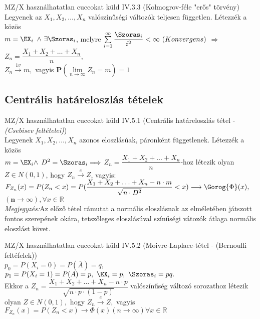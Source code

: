 \begin{tetel}{MZ/X használhatatlan cuccokat küld}
	IV.3.3 (Kolmogrov-féle "erős" törvény)\\[2pt]
		\forceindent Legyenek az $X_1,X_2,\ldots,X_n$ valószínűségi változók teljesen független. Létezzék a közös \\[2pt]$m = \EX_i$ $\land\ \exists \Szoras_i$, melyre $\sum\limits_{i=1}^\infty \dfrac{\Szoras_i}{i^2} < \infty \ (Konvergens)$ $\Longrightarrow$ $Z_n = \dfrac{X_1+X_2+\ldots+X_n}{n},$ \\[2pt]
		$Z_n \xrightarrow{1v} m,$ vagyis $\mathbf{P}(\lim\limits_{n \to \infty} Z_n = m) = 1$
\end{tetel}
\subsection{Centrális határeloszlás tételek}
	\begin{tetel}{MZ/X használhatatlan cuccokat küld}
  IV.5.1 (Centrális határeloszlás tétel - \textit{(Csebisev feltételei)})\\[2pt]
	\forceindent  Legyenek $X_1,X_2,\ldots,X_n$ azonos eloszlásúak, páronként függetlenek. Létezzék a közös\\[1pt] $m = \EX_i \land$  $D^2 = \Szoras_i \Longrightarrow$  $Z_n = \dfrac{X_1+X_2+\ldots+X_n}{n}$-hoz létezik olyan $Z \in N(0,1)$, hogy $Z_n \xrightarrow{e} Z$,
	vagyis: $F_{Z_n}(x) = P(Z_n < x) = P(\dfrac{X_1+X_2+\ldots+X_n - n\cdot m}{\sqrt{n \cdot D^2} } < x) \longrightarrow \Gorog{\Phi} (x), \quad $
	$\mathbf{(n \rightarrow \infty)}, \forall x \in \mathbb{R}$ \\[2pt]
	\textit{Megjegyzés:}\small Az előző tétel rámutat a normális eloszlásnak az elméletében játszott fontos szerepének okára, tetszőleges eloszlásúval
színűségi vátozók átlaga normális eloszlást követ.\normalsize \\[3pt]
\end{tetel}

  \begin{tetel}{MZ/X használhatatlan cuccokat küld}
	IV.5.2 (Moivre-Laplace-tétel - (Bernoulli feltéfelek))\\[2pt]
	$p_0 = P(X_i = 0) = P(\overline{A}) = q,$ \ $p_1 = P(X_i = 1) = P(A) = p,\ \EX_i = p,\ \Szoras_i = pq.$ \\[2pt]
	Ekkor a $Z_n = \dfrac{X_1+X_2+\ldots+X_n - n \cdot p}{\sqrt{n \cdot p\cdot (1-p) }}$ valószínűség változó sorozathoz létezik olyan $Z \in N(0,1),$ hogy $Z_n \xrightarrow{e} Z,$ vagyis $F_{Z_n}(x) = P(Z_n <x) \rightarrow  \Phi (x) (n \rightarrow \infty) \forall x \in \mathbb{R}$\\[3pt]
\end{tetel}
